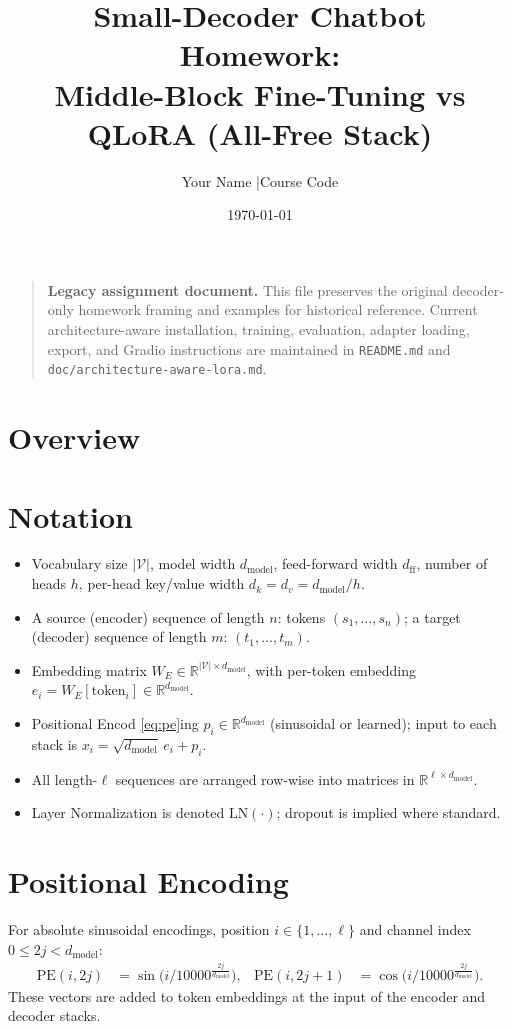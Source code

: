 \documentclass[11pt]{article}
\title{Small-Decoder \textbf{Chatbot} Homework:\\ Middle-Block Fine-Tuning vs QLoRA (All-Free Stack)}
\author{Your Name \quad|\quad Course Code}
\date{\today}
\begin{document}
\maketitle

\begin{quote}
\textbf{Legacy assignment document.} This file preserves the original decoder-only homework framing and examples for historical reference. Current architecture-aware installation, training, evaluation, adapter loading, export, and Gradio instructions are maintained in \texttt{README.md} and \texttt{doc/architecture-aware-lora.md}.
\end{quote}

\section*{Overview}

\section*{Notation}
\begin{itemize}[leftmargin=2em]
  \item Vocabulary size $|\mathcal{V}|$, model width $d_{\text{model}}$, feed-forward width $d_{\text{ff}}$, number of heads $h$, per-head key/value width $d_k=d_v=d_{\text{model}}/h$.
  \item A source (encoder) sequence of length $n$: tokens $(s_1,\dots,s_n)$; a target (decoder) sequence of length $m$: $(t_1,\dots,t_m)$.
  \item Embedding matrix $W_E \in \mathbb{R}^{|\mathcal{V}|\times d_{\text{model}}}$, with per-token embedding $e_i = W_E[\text{token}_i] \in \mathbb{R}^{d_{\text{model}}}$.
  \item Positional Encod \eqref{eq:pe}ing $p_i \in \mathbb{R}^{d_{\text{model}}}$ (sinusoidal or learned); input to each stack is $x_i = \sqrt{d_{\text{model}}}\,e_i + p_i$.
  \item All length-$\ell$ sequences are arranged row-wise into matrices in $\mathbb{R}^{\ell\times d_{\text{model}}}$.
  \item Layer Normalization is denoted $\mathrm{LN}(\cdot)$; dropout is implied where standard.
\end{itemize}

\section{Positional Encoding}
For absolute sinusoidal encodings, position $i\!\in\!\{1,\dots,\ell\}$ and channel index $0\!\leq\!2j\!<\!d_{\text{model}}$:
\begin{align}
\mathrm{PE}(i,2j)   &= \sin\!\Big(i/10000^{\frac{2j}{d_{\text{model}}}}\Big),&
\mathrm{PE}(i,2j\!+\!1) &= \cos\!\Big(i/10000^{\frac{2j}{d_{\text{model}}}}\Big). \label{eq:pe}
\end{align}
These vectors are added to token embeddings at the input of the encoder and decoder stacks.
\end{document}
